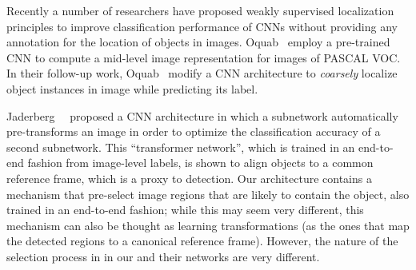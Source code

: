 Recently a number of researchers \cite{Oquab14,Oquab15} have proposed weakly supervised localization principles to improve classification performance of CNNs without providing any annotation for the location of objects in images. Oquab~\etal \cite{Oquab14} employ a pre-trained CNN to compute a mid-level image representation for images of PASCAL VOC. In their follow-up work, Oquab~\etal \cite{Oquab15} modify a CNN architecture to \emph{coarsely} localize object instances in image while predicting its label. 

Jaderberg~\etal~\cite{Jaderberg15c} proposed a CNN architecture in which a subnetwork automatically pre-transforms an image in order to optimize the classification accuracy of a second subnetwork. This ``transformer network'', which is trained in an end-to-end fashion from image-level labels, is shown to align objects to a common reference frame, which is a proxy to detection. Our architecture contains a mechanism that pre-select image regions that are likely to contain the object, also trained in an end-to-end fashion; while this may seem very different, this mechanism can also be thought as learning transformations (as the ones that map the detected regions to a canonical reference frame). However, the nature of the selection process in in our and their networks are very different.
